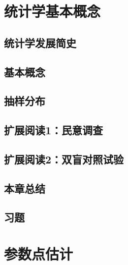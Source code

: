 \documentclass[UTF8,12pt,a4paper,fontset=fandol]{ctexbook}
\begin{document}
\chapter{统计学基本概念}
\label{chap:study-statistics-basics}

\section{统计学发展简史}
\label{sec:study-statistics-history}

\section{基本概念}
\label{sec:study-statistical-concepts}

\section{抽样分布}
\label{sec:study-sampling-distributions}

\section{扩展阅读1：民意调查}
\label{sec:study-opinion-polls}

\section{扩展阅读2：双盲对照试验}
\label{sec:study-double-blind-trials}

\section*{本章总结}

\section*{习题}

\chapter{参数点估计}
\label{chap:study-point-estimation}
\end{document}
